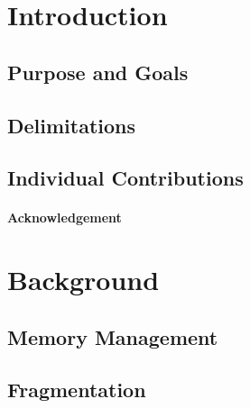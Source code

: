 \documentclass[a4paper,12pt]{article}
\begin{document}
\tableofcontents


\cleardoublepage

\mainmatter


\section{Introduction}
\label{sec:introduction}


\subsection{Purpose and Goals}
\label{sec:purpose}


\subsection{Delimitations}
\label{sec:delimitations}


\subsection{Individual Contributions}
\label{sec:individual_contrubitons}


\paragraph{Acknowledgement}


\newpage
\section{Background}
\label{sec:background}


\subsection{Memory Management}
\label{sec:memory_management}


\subsection{Fragmentation}
\label{sec:fragmentation}

\end{document}
